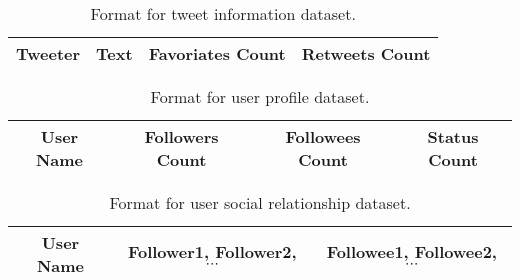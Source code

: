 \begin{table}[htpb]
\centering
\begin{tabular}{|c|c|c|c|}
\hline
Tweeter  & Text  & Favoriates Count & Retweets Count \\
\hline
\end{tabular}
\caption{Format for tweet information dataset.}
\label{tab:tweet information}
\end{table}

\begin{table}[htpb]
\centering
\begin{tabular}{|c|c|c|c|}
\hline
User Name & Followers Count & Followees Count & Status Count \\
\hline
\end{tabular}
\caption{Format for user profile dataset.}
\label{tab:user profile}
\end{table}

\begin{table}[htpb]
\centering
\begin{tabular}{|c|c|c|}
\hline
User Name & Follower1, Follower2, $\cdots$ & Followee1, Followee2, $\cdots$ \\
\hline
\end{tabular}
\caption{Format for user social relationship dataset.}
\label{tab:social relationship}
\end{table}